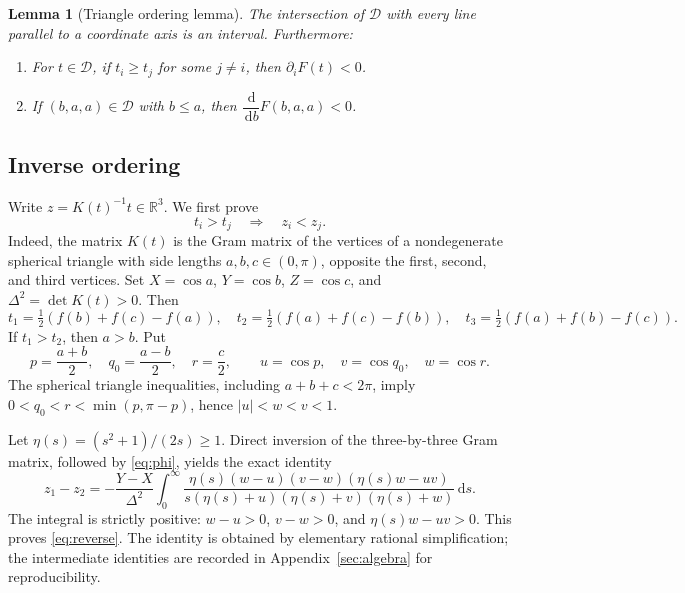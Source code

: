 \documentclass[11pt,reqno]{amsart}
\newtheorem{lemma}[theorem]{Lemma}
\theoremstyle{remark}
\newcommand{\R}{\mathbb R}
\newcommand{\dd}{\,\mathrm d}
\begin{document}
\begin{lemma}[Triangle ordering lemma]\label{lem:triangle}
The intersection of $\mathcal D$ with every line parallel to a coordinate axis is an interval. Furthermore:
\begin{enumerate}[label=\textup{(\roman*)},itemsep=2pt]
\item For $t\in\mathcal D$, if $t_i\ge t_j$ for some $j\ne i$, then $\partial_iF(t)<0$.
\item If $(b,a,a)\in\mathcal D$ with $b\le a$, then $\dfrac{\dd}{\dd b}F(b,a,a)<0$.
\end{enumerate}
\end{lemma}

\subsection{Inverse ordering}
Write $z=K(t)^{-1}t\in\R^3$. We first prove
\begin{equation}\label{eq:reverse}
 t_i>t_j\quad\Longrightarrow\quad z_i<z_j.
\end{equation}
Indeed, the matrix $K(t)$ is the Gram matrix of the vertices of a nondegenerate spherical triangle with side lengths $a,b,c\in(0,\pi)$, opposite the first, second, and third vertices. Set $X=\cos a$, $Y=\cos b$, $Z=\cos c$, and $\Delta^2=\det K(t)>0$. Then
\begin{equation}\label{eq:tsides}
 t_1=\tfrac12(f(b)+f(c)-f(a)),\quad
 t_2=\tfrac12(f(a)+f(c)-f(b)),\quad
 t_3=\tfrac12(f(a)+f(b)-f(c)).
\end{equation}
If $t_1>t_2$, then $a>b$. Put
\begin{equation}\label{eq:uvw}
 p=\frac{a+b}2,\quad q_0=\frac{a-b}2,\quad r=\frac c2,
 \qquad u=\cos p,\quad v=\cos q_0,\quad w=\cos r.
\end{equation}
The spherical triangle inequalities, including $a+b+c<2\pi$, imply
$0<q_0<r<\min(p,\pi-p)$, hence $|u|<w<v<1$.

Let $\eta(s)=(s^2+1)/(2s)\ge1$. Direct inversion of the three-by-three Gram matrix, followed by \eqref{eq:phi}, yields the exact identity
\begin{equation}\label{eq:kernel}
 z_1-z_2=-\frac{Y-X}{\Delta^2}\int_0^\infty
 \frac{\eta(s)(w-u)(v-w)(\eta(s)w-uv)}
 {s(\eta(s)+u)(\eta(s)+v)(\eta(s)+w)}\dd s.
\end{equation}
The integral is strictly positive: $w-u>0$, $v-w>0$, and $\eta(s)w-uv>0$. This proves \eqref{eq:reverse}. The identity is obtained by elementary rational simplification; the intermediate identities are recorded in Appendix~\ref{sec:algebra} for reproducibility.
\end{document}
